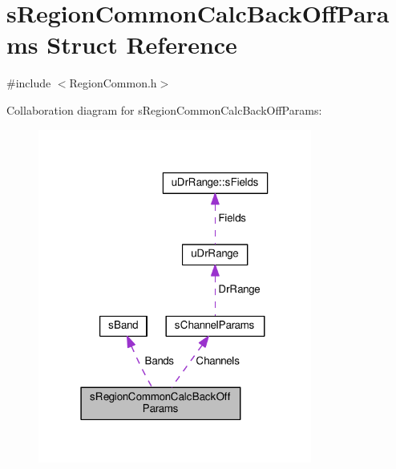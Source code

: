 \hypertarget{structsRegionCommonCalcBackOffParams}{}\section{s\+Region\+Common\+Calc\+Back\+Off\+Params Struct Reference}
\label{structsRegionCommonCalcBackOffParams}


{\ttfamily \#include $<$Region\+Common.\+h$>$}



Collaboration diagram for s\+Region\+Common\+Calc\+Back\+Off\+Params\+:
\nopagebreak
\begin{figure}[H]
\begin{center}
\leavevmode
\includegraphics[width=255pt]{structsRegionCommonCalcBackOffParams__coll__graph}
\end{center}
\end{figure}
